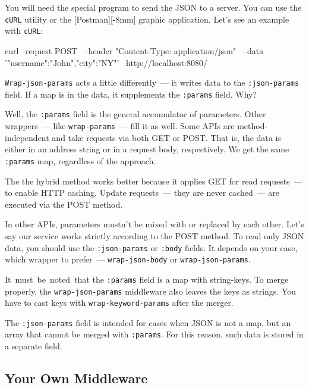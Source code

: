 
You will need the special program to send the JSON to a server. You can use the \verb|cURL| utility or the [Post\-man][-8mm] graphic application.  Let's see an example with \verb|cURL|:

\begin{english}
\begin{bash}
curl --request POST \
--header "Content-Type: application/json" \
--data '{"username":"John","city":"NY"}' \
http://localhost:8080/
\end{bash}
\end{english}

\verb|Wrap-json-params| acts a little differently~--- it writes data to the \verb|:json-params| field. If a map is in the data, it supplements the \verb|:params| field. Why?

Well, the \verb|:params| field is the general accumulator of parameters. Other wrappers~--- like \verb|wrap-params|~--- fill it as well. Some APIs are method-independent and take requests via both GET or POST. That is, the data is either in an address string or in a request body, respectively. We get the same \verb|:params| map, regardless of the approach.

The the hybrid method works better because it applies GET for read requests~--- to enable HTTP caching.  Update requests~--- they are never cached~--- are executed 
via the POST method.

In other APIs, parameters mustn't be mixed with or replaced by each other. Let's say our service works strictly according to the POST method. To read only JSON data, you should use the \verb|:json-params| or \verb|:body| fields. It depends on your case, which wrapper to prefer~--- \verb|wrap-json-body| or \verb|wrap-json-params|.


It must be noted that the \verb|:params| field is a map with string-keys. To merge properly, the \verb|wrap-json-params| middleware also leaves the keys as strings. You have to cast keys with \verb|wrap-keyword-params| after the merger. 

The \verb|:json-params| field is intended for cases when JSON is not a map, but an array that cannot be merged with \verb|:params|. For this reason, such data is stored in a separate field.

\subsection{Your Own Middleware}

